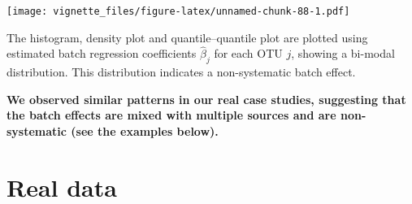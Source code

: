 \documentclass[]{book}
\newenvironment{Shaded}{\begin{snugshade}}{\end{snugshade}}
\newcommand{\KeywordTok}[1]{\textcolor[rgb]{0.13,0.29,0.53}{\textbf{#1}}}
\newcommand{\DataTypeTok}[1]{\textcolor[rgb]{0.13,0.29,0.53}{#1}}
\newcommand{\DecValTok}[1]{\textcolor[rgb]{0.00,0.00,0.81}{#1}}
\newcommand{\StringTok}[1]{\textcolor[rgb]{0.31,0.60,0.02}{#1}}
\newcommand{\ControlFlowTok}[1]{\textcolor[rgb]{0.13,0.29,0.53}{\textbf{#1}}}
\newcommand{\OperatorTok}[1]{\textcolor[rgb]{0.81,0.36,0.00}{\textbf{#1}}}
\newcommand{\NormalTok}[1]{#1}
\begin{document}
\begin{Shaded}
\end{Shaded}

\texttt{[image: vignette\_files/figure-latex/unnamed-chunk-88-1.pdf]}

The histogram, density plot and quantile--quantile plot are plotted
using estimated batch regression coefficients \(\hat{\beta}_{j}\) for
each OTU \(j\), showing a bi-modal distribution. This distribution
indicates a non-systematic batch effect.

\textbf{We observed similar patterns in our real case studies,
suggesting that the batch effects are mixed with multiple sources and
are non-systematic (see the examples below).}

\section{Real data}\label{real-data}
\end{document}
